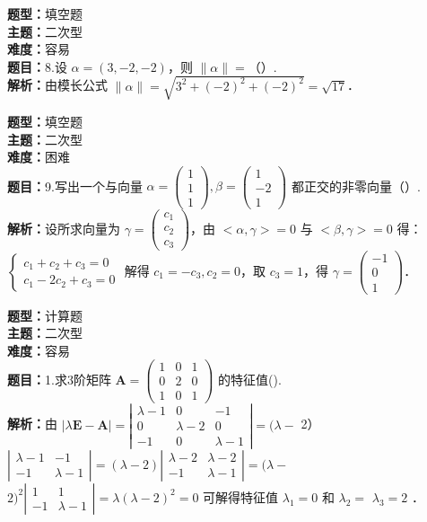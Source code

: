 \documentclass{ctexart}
\newenvironment{question}[5]{%
	\noindent\textbf{题型：}#1\\
	\textbf{主题：}#2\\
	\textbf{难度：}#3\\
	\textbf{题目：}#4\\
	\textbf{解析：}#5\\
	\vspace{1em}
}{}
\begin{document}
	\begin{question}
		{填空题}
		{二次型}
		{容易}
		{8.设 \(\alpha = (3,-2,-2)\)，则 \(\|\alpha\| = \)（）. }
		{由模长公式 \(\|\alpha\| = \sqrt{3^2 + (-2)^2 + (-2)^2} = \sqrt{17}\)．}
	\end{question}
	
	\begin{question}
		{填空题}
		{二次型}
		{困难}
		{9.写出一个与向量 \(\alpha=\left(\begin{array}{l}1 \\ 1 \\ 1\end{array}\right), \beta=\left(\begin{array}{l}1 \\ -2 \\ 1\end{array}\right)\) 都正交的非零向量（）. }
		{设所求向量为 \(\gamma=\left(\begin{array}{l}c_1 \\ c_2 \\ c_3\end{array}\right)\)，由 \(<\alpha, \gamma>=0\) 与 \(<\beta, \gamma>=0\) 得：\\
			\(\begin{cases}
				c_1 + c_2 + c_3 = 0 \\
				c_1 - 2c_2 + c_3 = 0
			\end{cases}\) 解得 \(c_1 = -c_3, c_2 = 0\)，取 \(c_3 = 1\)，得 \(\gamma = \left(\begin{array}{c}-1 \\ 0 \\ 1\end{array}\right)\)．}
	\end{question}
	
	
	
	\begin{question}
		{计算题}
		{二次型}
		{容易}
		{1.求3阶矩阵 \(\mathbf{A}=\left(\begin{array}{lll}1 & 0 & 1 \\ 0 & 2 & 0 \\ 1 & 0 & 1\end{array}\right)\) 的特征值(\qquad). }
		{由 \(|\lambda \mathbf{E}-\mathbf{A}|=\left|\begin{array}{ccc}\lambda-1 & 0 & -1 \\ 0 & \lambda-2 & 0 \\ -1 & 0 & \lambda-1\end{array}\right|=(\lambda-\)
			2）\(\left|\begin{array}{cc}\lambda-1 & -1 \\ -1 & \lambda-1\end{array}\right|=(\lambda-2)\left|\begin{array}{cc}\lambda-2 & \lambda-2 \\ -1 & \lambda-1\end{array}\right|=(\lambda-\)
			\(2)^2\left|\begin{array}{cc}1 & 1 \\ -1 & \lambda-1\end{array}\right|=\lambda(\lambda-2)^2=0\) 可解得特征值 \(\lambda_1=0\) 和 \(\lambda_2=\) \(\lambda_3=2\) ．}
	\end{question}
	
\end{document}
